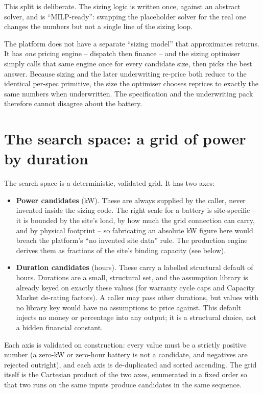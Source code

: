This split is deliberate. The sizing logic is written once, against an abstract solver, and is ``MILP-ready'': swapping the placeholder solver for the real one changes the numbers but not a single line of the sizing loop.

\begin{keyidea}
The platform does not have a separate ``sizing model'' that approximates returns. It has \emph{one} pricing engine -- dispatch then finance -- and the sizing optimiser simply calls that same engine once for every candidate size, then picks the best answer. Because sizing and the later underwriting re-price both reduce to the identical per-spec primitive, the size the optimiser chooses reprices to exactly the same numbers when underwritten. The specification and the underwriting pack therefore cannot disagree about the battery.
\end{keyidea}

\section{The search space: a grid of power by duration}

The search space is a deterministic, validated grid. It has two axes:

\begin{itemize}
  \item \textbf{Power candidates} (kW). These are always supplied by the caller, never invented inside the sizing code. The right scale for a battery is site-specific -- it is bounded by the site's load, by how much the grid connection can carry, and by physical footprint -- so fabricating an absolute kW figure here would breach the platform's ``no invented site data'' rule. The production engine derives them as fractions of the site's binding capacity (see below).
  \item \textbf{Duration candidates} (hours). These carry a labelled structural default of  hours. Durations are a small, structural set, and the assumption library is already keyed on exactly these values (for warranty cycle caps and Capacity Market de-rating factors). A caller may pass other durations, but values with no library key would have no assumptions to price against. This default injects no money or percentage into any output; it is a structural choice, not a hidden financial constant.
\end{itemize}

Each axis is validated on construction: every value must be a strictly positive number (a zero-kW or zero-hour battery is not a candidate, and negatives are rejected outright), and each axis is de-duplicated and sorted ascending. The grid itself is the Cartesian product of the two axes, enumerated in a fixed  order so that two runs on the same inputs produce candidates in the same sequence.


